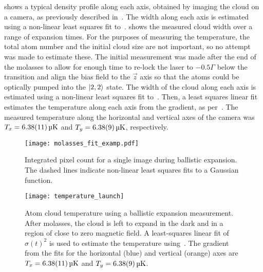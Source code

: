  shows a typical density
profile along each axis, obtained by imaging the cloud on a camera, as
previously described in~. The width along each
axis is estimated using a non-linear least squares fit
to~.
 shows the measured cloud width
over a range of expansion times. For the purposes of
measuring the temperature, the total atom number and the initial cloud
size are not important, so no attempt was made to estimate these. The
initial measurement was made  after the end
of the molasses to allow for enough time to re-lock the laser to
\(-0.5\Gamma\) below the  transition and align the bias
field to the \(\vec{z}\) axis so that the atoms could be optically
pumped into the \(\ket{2,2}\) state. The width of the cloud along each
axis is estimated using a
non-linear least squares fit to~. Then, a
least squares linear fit estimates the temperature along
each axis from the gradient, as per~.
The measured temperature along the horizontal and vertical axes of the
camera was \(T_x = \sivalue{6.38 \pm 0.11}{\micro\kelvin}\) and \(T_y =
\sivalue{6.38 \pm 0.09}{\micro\kelvin}\), respectively.  
\begin{figure}[htpb]
  \centering
  \texttt{[image: molasses\_fit\_examp.pdf]}
  \caption[Integrated pixel counts during ballistic expansion.]{Integrated pixel count for a single image during ballistic
  expansion. The dashed lines indicate non-linear least squares fits
to a Gaussian function.}
  \label{fig:molasses_fit_examp}
\end{figure}
\begin{figure}[!htbp]
    \centering
    \texttt{[image: temperature\_launch]}
    \caption[Temperature measurement using ballistic expansion]{Atom
    cloud temperature using a ballistic expansion measurement. After
  molasses, the cloud is left to expand in the dark and in a region of
close to zero magnetic field. A least-squares linear fit of
\(\sigma(t)^2\) is used to estimate the temperature
using~.  The
gradient from the fits for the horizontal (blue) and vertical (orange)
axes are  \(T_x = \sivalue{6.38 \pm0.11}{\micro\kelvin}\) and \(T_y =
\sivalue{6.38\pm0.09}{\micro\kelvin}\).}
    \label{fig:molasses_temperature}
\end{figure}

